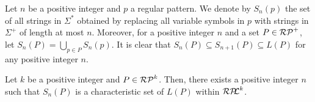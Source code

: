 Let $n$ be a positive integer and $p$ a regular pattern. %
We denote by $S_{n}(p)$ the set of all strings in $\Sigma^{\ast}$ obtained by replacing all variable symbols in $p$
with strings in $\Sigma^{+}$ of length at most $n$.
Moreover, for a positive integer $n$ and a set $P \in \mathcal{RP}^{+}$, 
let $S_{n}(P)=\bigcup_{p \in P}S_{n}(p)$.
It is clear that $S_{n}(P) \subseteq S_{n+1}(P) \subseteq L(P)$ for any positive integer $n$.
%
%

\begin{thm}
    Let $k$ be a positive integer and $P \in \mathcal{RP}^{k}$.
    Then, there exists a positive integer $n$ such that $S_{n}(P)$ is a characteristic set of $L(P)$ within $\mathcal{RP\!\!L}^{k}$.
\end{thm}


